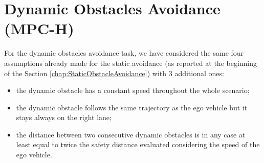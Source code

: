 \section{Dynamic Obstacles Avoidance (MPC-H)}
For the dynamic obstacles avoidance task, we have considered the same four assumptions already made for the static avoidance (as reported at the beginning of the Section \ref{chap:StaticObstacleAvoidance}) with 3 additional ones:
\begin{itemize}
    \item the dynamic obstacle has a constant speed throughout the whole scenario;
    \item the dynamic obstacle follows the same trajectory as the ego vehicle but it stays always on the right lane;
    \item the distance between two consecutive dynamic obstacles is in any case at least equal to twice the safety distance evaluated considering the speed of the ego vehicle.
\end{itemize}

